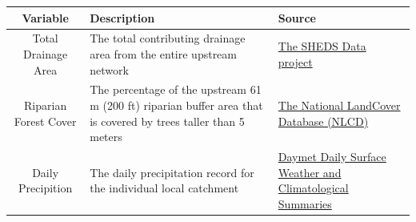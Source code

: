 \documentclass[]{article}
\begin{document}
\begin{longtable}[]{@{}cll@{}}
\toprule
\begin{minipage}[b]{0.19\columnwidth}\centering\strut
Variable\strut
\end{minipage} & \begin{minipage}[b]{0.43\columnwidth}\raggedright\strut
Description\strut
\end{minipage} & \begin{minipage}[b]{0.23\columnwidth}\raggedright\strut
Source\strut
\end{minipage}\tabularnewline
\midrule
\endhead
\begin{minipage}[t]{0.19\columnwidth}\centering\strut
Total Drainage Area\strut
\end{minipage} & \begin{minipage}[t]{0.43\columnwidth}\raggedright\strut
The total contributing drainage area from the entire upstream
network\strut
\end{minipage} & \begin{minipage}[t]{0.23\columnwidth}\raggedright\strut
\href{http://conte-ecology.github.io/shedsData/}{The SHEDS Data
project}\strut
\end{minipage}\tabularnewline
\begin{minipage}[t]{0.19\columnwidth}\centering\strut
Riparian Forest Cover\strut
\end{minipage} & \begin{minipage}[t]{0.43\columnwidth}\raggedright\strut
The percentage of the upstream 61 m (200 ft) riparian buffer area that
is covered by trees taller than 5 meters\strut
\end{minipage} & \begin{minipage}[t]{0.23\columnwidth}\raggedright\strut
\href{http://www.mrlc.gov/nlcd06_data.php}{The National LandCover
Database (NLCD)}\strut
\end{minipage}\tabularnewline
\begin{minipage}[t]{0.19\columnwidth}\centering\strut
Daily Precipition\strut
\end{minipage} & \begin{minipage}[t]{0.43\columnwidth}\raggedright\strut
The daily precipitation record for the individual local catchment\strut
\end{minipage} & \begin{minipage}[t]{0.23\columnwidth}\raggedright\strut
\href{https://daymet.ornl.gov/}{Daymet Daily Surface Weather and
Climatological Summaries}\strut
\end{minipage}\tabularnewline

\end{longtable}
\end{document}
